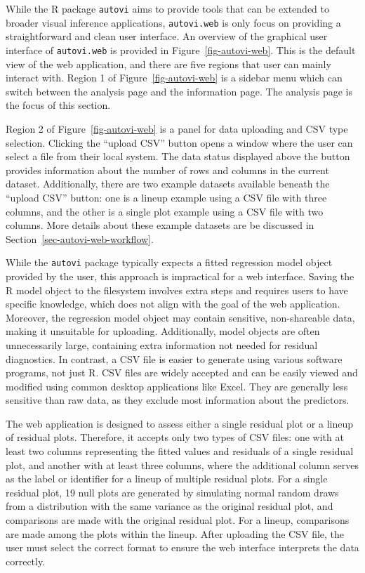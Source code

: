\documentclass[
doublespace,
  times]{anzsauth}
\begin{document}
While the R package \texttt{autovi} aims to provide tools that can be
extended to broader visual inference applications, \texttt{autovi.web}
is only focus on providing a straightforward and clean user interface.
An overview of the graphical user interface of \texttt{autovi.web} is
provided in Figure~\ref{fig-autovi-web}. This is the default view of the
web application, and there are five regions that user can mainly
interact with. Region 1 of Figure~\ref{fig-autovi-web} is a sidebar menu
which can switch between the analysis page and the information page. The
analysis page is the focus of this section.

Region 2 of Figure~\ref{fig-autovi-web} is a panel for data uploading
and CSV type selection. Clicking the ``upload CSV'' button opens a
window where the user can select a file from their local system. The
data status displayed above the button provides information about the
number of rows and columns in the current dataset. Additionally, there
are two example datasets available beneath the ``upload CSV'' button:
one is a lineup example using a CSV file with three columns, and the
other is a single plot example using a CSV file with two columns. More
details about these example datasets are be discussed in
Section~\ref{sec-autovi-web-workflow}.

While the \texttt{autovi} package typically expects a fitted regression
model object provided by the user, this approach is impractical for a
web interface. Saving the R model object to the filesystem involves
extra steps and requires users to have specific knowledge, which does
not align with the goal of the web application. Moreover, the regression
model object may contain sensitive, non-shareable data, making it
unsuitable for uploading. Additionally, model objects are often
unnecessarily large, containing extra information not needed for
residual diagnostics. In contrast, a CSV file is easier to generate
using various software programs, not just R. CSV files are widely
accepted and can be easily viewed and modified using common desktop
applications like Excel. They are generally less sensitive than raw
data, as they exclude most information about the predictors.

The web application is designed to assess either a single residual plot
or a lineup of residual plots. Therefore, it accepts only two types of
CSV files: one with at least two columns representing the fitted values
and residuals of a single residual plot, and another with at least three
columns, where the additional column serves as the label or identifier
for a lineup of multiple residual plots. For a single residual plot, 19
null plots are generated by simulating normal random draws from a
distribution with the same variance as the original residual plot, and
comparisons are made with the original residual plot. For a lineup,
comparisons are made among the plots within the lineup. After uploading
the CSV file, the user must select the correct format to ensure the web
interface interprets the data correctly.
\end{document}
